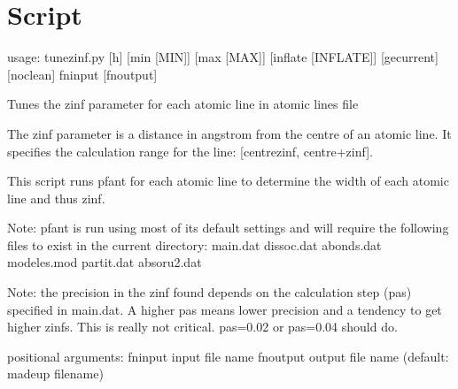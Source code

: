 \documentclass[letterpaper,10pt,english]{sphinxmanual}
\begin{document}
\section{Script }
\label{\detokenize{autoscripts/script-tune-zinf::doc}}\label{\detokenize{autoscripts/script-tune-zinf:script-tune-zinf-py}}
\begin{sphinxVerbatim}[commandchars=\\\{\}]
usage: tune\PYGZhy{}zinf.py [\PYGZhy{}h] [\PYGZhy{}\PYGZhy{}min [MIN]] [\PYGZhy{}\PYGZhy{}max [MAX]] [\PYGZhy{}\PYGZhy{}inflate [INFLATE]]
                    [\PYGZhy{}\PYGZhy{}ge\PYGZus{}current] [\PYGZhy{}\PYGZhy{}no\PYGZus{}clean]
                    fn\PYGZus{}input [fn\PYGZus{}output]

Tunes the \PYGZdq{}zinf\PYGZdq{} parameter for each atomic line in atomic lines file

The \PYGZdq{}zinf\PYGZdq{} parameter is a distance in angstrom from the centre of an atomic
line. It specifies the calculation range for the line:
[centre\PYGZhy{}zinf, centre+zinf].

This script runs pfant for each atomic line to determine the width of each
atomic line and thus zinf.

Note: pfant is run using most of its default settings and will require the
following files to exist in the current directory:
  \PYGZhy{} main.dat
  \PYGZhy{} dissoc.dat
  \PYGZhy{} abonds.dat
  \PYGZhy{} modeles.mod
  \PYGZhy{} partit.dat
  \PYGZhy{} absoru2.dat

Note: the precision in the zinf found depends on the calculation step (\PYGZdq{}pas\PYGZdq{})
specified in main.dat. A higher \PYGZdq{}pas\PYGZdq{} means lower precision and a tendency to
get higher zinf\PYGZsq{}s. This is really not critical. pas=0.02 or pas=0.04 should do.

positional arguments:
  fn\PYGZus{}input             input file name
  fn\PYGZus{}output            output file name (default: \PYGZlt{}made\PYGZhy{}up filename\PYGZgt{})


\end{sphinxVerbatim}
\end{document}
